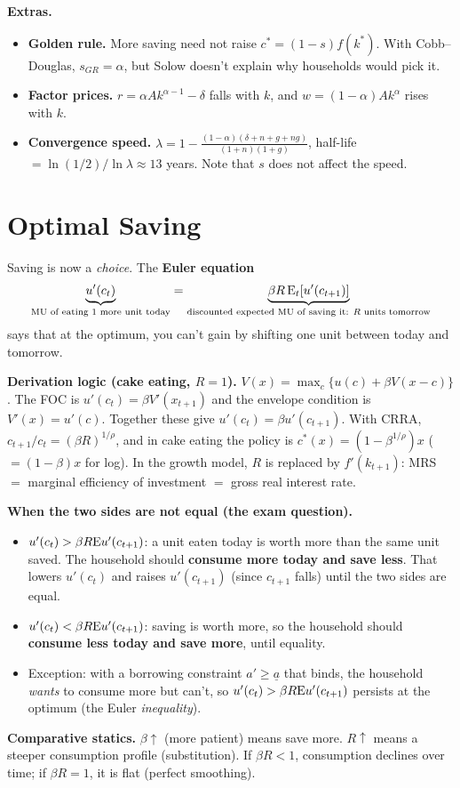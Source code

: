 \documentclass[10pt]{article}
\begin{document}
\textbf{Extras.}
\begin{itemize}
\item \textbf{Golden rule.} More saving need not raise $c^*=(1-s)f(k^*)$. With Cobb--Douglas, $s_{GR}=\alpha$, but Solow doesn't explain why households would pick it.
\item \textbf{Factor prices.} $r=\alpha Ak^{\alpha-1}-\delta$ falls with $k$, and $w=(1-\alpha)Ak^\alpha$ rises with $k$.
\item \textbf{Convergence speed.} $\lambda=1-\frac{(1-\alpha)(\delta+n+g+ng)}{(1+n)(1+g)}$, half-life $=\ln(1/2)/\ln\lambda\approx13$ years. Note that $s$ does not affect the speed.
\end{itemize}

\section{Optimal Saving}

\begin{bigidea}
Saving is now a \emph{choice}. The \textbf{Euler equation}
\[\underbrace{u'(c_t)}_{\text{MU of eating 1 more unit today}}=\underbrace{\beta R\,\mathrm{E}_t[u'(c_{t+1})]}_{\text{discounted expected MU of saving it: }R\text{ units tomorrow}}\]
says that at the optimum, you can't gain by shifting one unit between today and tomorrow.
\end{bigidea}

\textbf{Derivation logic (cake eating, $R=1$).} $V(x)=\max_c\{u(c)+\beta V(x-c)\}$. The FOC is $u'(c_t)=\beta V'(x_{t+1})$ and the envelope condition is $V'(x)=u'(c)$. Together these give $u'(c_t)=\beta u'(c_{t+1})$. With CRRA, $c_{t+1}/c_t=(\beta R)^{1/\rho}$, and in cake eating the policy is $c^*(x)=(1-\beta^{1/\rho})x$ ($=(1-\beta)x$ for log). In the growth model, $R$ is replaced by $f'(k_{t+1})$: MRS $=$ marginal efficiency of investment $=$ gross real interest rate.

\textbf{When the two sides are not equal (the exam question).}
\begin{itemize}
\item $u'(c_t)>\beta R\mathrm{E} u'(c_{t+1})$: a unit eaten today is worth more than the same unit saved. The household should \textbf{consume more today and save less}. That lowers $u'(c_t)$ and raises $u'(c_{t+1})$ (since $c_{t+1}$ falls) until the two sides are equal.
\item $u'(c_t)<\beta R\mathrm{E} u'(c_{t+1})$: saving is worth more, so the household should \textbf{consume less today and save more}, until equality.
\item Exception: with a borrowing constraint $a'\ge\underline a$ that binds, the household \emph{wants} to consume more but can't, so $u'(c_t)>\beta R\mathrm{E} u'(c_{t+1})$ persists at the optimum (the Euler \emph{inequality}).
\end{itemize}
\textbf{Comparative statics.} $\beta\uparrow$ (more patient) means save more. $R\uparrow$ means a steeper consumption profile (substitution). If $\beta R<1$, consumption declines over time; if $\beta R=1$, it is flat (perfect smoothing).
\end{document}
